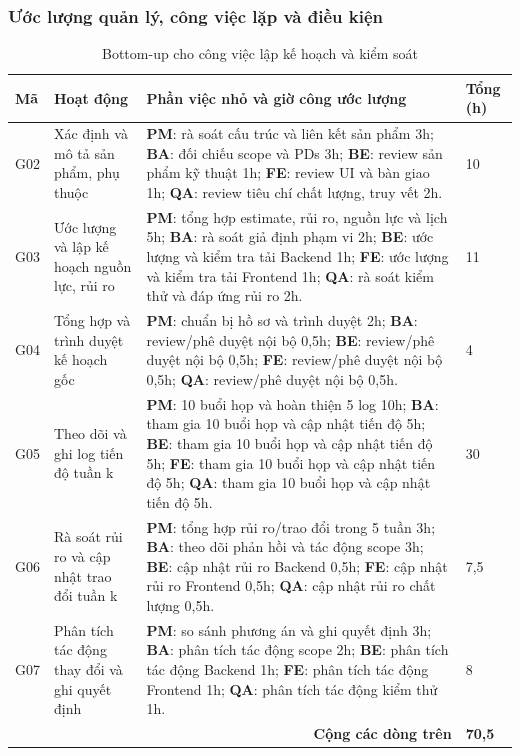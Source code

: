 \documentclass{article}
\begin{document}
\begin{landscape}
\subsubsection{Ước lượng quản lý, công việc lặp và điều kiện}
\begin{table}[H]
\centering
\caption{Bottom-up cho công việc lập kế hoạch và kiểm soát}
\small
\renewcommand{\arraystretch}{1.2}
\begin{tabularx}{\linewidth}{|p{1.1cm}|p{5.3cm}|>{\raggedright\arraybackslash}X|p{1.25cm}|}
\hline
\textbf{Mã} & \textbf{Hoạt động} & \textbf{Phần việc nhỏ và giờ công ước lượng} & \textbf{Tổng (h)} \\ \hline
G02 & Xác định và mô tả sản phẩm, phụ thuộc & \textbf{PM}: rà soát cấu trúc và liên kết sản phẩm 3h; \textbf{BA}: đối chiếu scope và PDs 3h; \textbf{BE}: review sản phẩm kỹ thuật 1h; \textbf{FE}: review UI và bàn giao 1h; \textbf{QA}: review tiêu chí chất lượng, truy vết 2h. & 10 \\ \hline
G03 & Ước lượng và lập kế hoạch nguồn lực, rủi ro & \textbf{PM}: tổng hợp estimate, rủi ro, nguồn lực và lịch 5h; \textbf{BA}: rà soát giả định phạm vi 2h; \textbf{BE}: ước lượng và kiểm tra tải Backend 1h; \textbf{FE}: ước lượng và kiểm tra tải Frontend 1h; \textbf{QA}: rà soát kiểm thử và đáp ứng rủi ro 2h. & 11 \\ \hline
G04 & Tổng hợp và trình duyệt kế hoạch gốc & \textbf{PM}: chuẩn bị hồ sơ và trình duyệt 2h; \textbf{BA}: review/phê duyệt nội bộ 0,5h; \textbf{BE}: review/phê duyệt nội bộ 0,5h; \textbf{FE}: review/phê duyệt nội bộ 0,5h; \textbf{QA}: review/phê duyệt nội bộ 0,5h. & 4 \\ \hline
G05 & Theo dõi và ghi log tiến độ tuần k & \textbf{PM}: 10 buổi họp và hoàn thiện 5 log 10h; \textbf{BA}: tham gia 10 buổi họp và cập nhật tiến độ 5h; \textbf{BE}: tham gia 10 buổi họp và cập nhật tiến độ 5h; \textbf{FE}: tham gia 10 buổi họp và cập nhật tiến độ 5h; \textbf{QA}: tham gia 10 buổi họp và cập nhật tiến độ 5h. & 30 \\ \hline
G06 & Rà soát rủi ro và cập nhật trao đổi tuần k & \textbf{PM}: tổng hợp rủi ro/trao đổi trong 5 tuần 3h; \textbf{BA}: theo dõi phản hồi và tác động scope 3h; \textbf{BE}: cập nhật rủi ro Backend 0,5h; \textbf{FE}: cập nhật rủi ro Frontend 0,5h; \textbf{QA}: cập nhật rủi ro chất lượng 0,5h. & 7,5 \\ \hline
G07 & Phân tích tác động thay đổi và ghi quyết định & \textbf{PM}: so sánh phương án và ghi quyết định 3h; \textbf{BA}: phân tích tác động scope 2h; \textbf{BE}: phân tích tác động Backend 1h; \textbf{FE}: phân tích tác động Frontend 1h; \textbf{QA}: phân tích tác động kiểm thử 1h. & 8 \\ \hline
\multicolumn{3}{|r|}{\textbf{Cộng các dòng trên}} & \textbf{70,5} \\ \hline
\end{tabularx}
\end{table}


\end{landscape}
\end{document}
